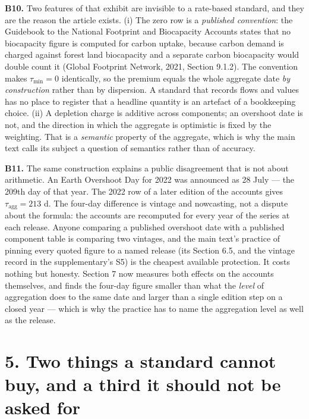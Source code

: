 \documentclass[11pt]{article}
\begin{document}
\textbf{B10.} Two features of that exhibit are invisible to a rate-based standard, and they are the reason the article exists. (i) The zero row is a \emph{published convention}: the Guidebook to the National Footprint and Biocapacity Accounts states that no biocapacity figure is computed for carbon uptake, because carbon demand is charged against forest land biocapacity and a separate carbon biocapacity would double count it (Global Footprint Network, 2021, Section 9.1.2). The convention makes \(\tau_{\min}=0\) identically, so the premium equals the whole aggregate date \emph{by construction} rather than by dispersion. A standard that records flows and values has no place to register that a headline quantity is an artefact of a bookkeeping choice. (ii) A depletion charge is additive across components; an overshoot date is not, and the direction in which the aggregate is optimistic is fixed by the weighting. That is a \emph{semantic} property of the aggregate, which is why the main text calls its subject a question of semantics rather than of accuracy.

\textbf{B11.} The same construction explains a public disagreement that is not about arithmetic. An Earth Overshoot Day for 2022 was announced as 28 July --- the 209th day of that year. The 2022 row of a later edition of the accounts gives \(\tau_{\mathrm{agg}} = 213\) d. The four-day difference is vintage and nowcasting, not a dispute about the formula: the accounts are recomputed for every year of the series at each release. Anyone comparing a published overshoot date with a published component table is comparing two vintages, and the main text's practice of pinning every quoted figure to a named release (its Section 6.5, and the vintage record in the supplementary's S5) is the cheapest available protection. It costs nothing but honesty. Section 7 now measures both effects on the accounts themselves, and finds the four-day figure smaller than what the \emph{level} of aggregation does to the same date and larger than a single edition step on a closed year --- which is why the practice has to name the aggregation level as well as the release.

\vspace{0.8em}

\section*{5. Two things a standard cannot buy, and a third it should not be asked for}\label{5-two-things-a-standard-cannot-buy-and-a-third-it-should-not-be-asked-}
\end{document}

